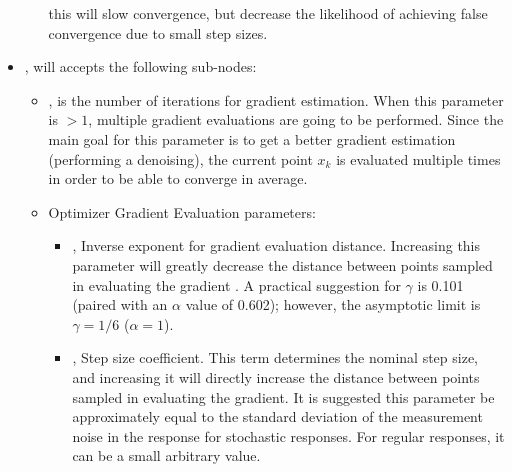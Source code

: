 \begin{itemize}
\begin{itemize}
    this will slow convergence, but decrease the likelihood of achieving false convergence due to small step
    sizes.
  \end{itemize}
\item {},  will accepts the following sub-nodes:
  \begin{itemize}
  \item {},  is the number of iterations for gradient estimation. When this
        parameter is $>1$, multiple gradient evaluations are going to be performed. Since the main goal for this parameter is to
        get a better gradient estimation (performing a denoising), the current point $x_k$ is evaluated multiple times in order to be able to
        converge in average.

  \item Optimizer Gradient Evaluation parameters:
    \begin{itemize}
      \item {},  Inverse exponent for gradient evaluation distance. Increasing this
        parameter will greatly decrease the distance between points sampled in evaluating the gradient
        \cite{spall1998implementation}. A practical suggestion for $\gamma$ is 0.101 (paired with an
        $\alpha$ value of 0.602); however, the asymptotic limit is $\gamma=1/6$ ($\alpha=1$). 
      \item {},  Step size coefficient.  This term determines the
        nominal step size, and increasing it will directly increase the distance between points sampled in evaluating the gradient.
        It is suggested this parameter be approximately equal to the standard
        deviation of the measurement noise in the response for stochastic responses.  For regular responses,
        it can be a small arbitrary value. 
    \end{itemize}


\end{itemize}
\end{itemize}
